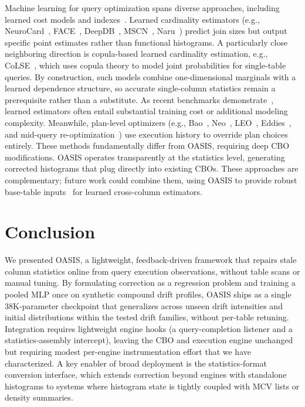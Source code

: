 \documentclass[runningheads]{llncs}
\begin{document}
Machine learning for query optimization spans diverse approaches, including learned cost models and indexes~\cite{kraska2018case,sun2019endtoend,wu2018towards}. Learned cardinality estimators (e.g., NeuroCard~\cite{yang2020neurocard}, FACE~\cite{yang2020face}, DeepDB~\cite{hilprecht2019deepdb}, MSCN~\cite{kipf2019learned}, Naru~\cite{yang2019deep}) predict join sizes but output specific point estimates rather than functional histograms. A particularly close neighboring direction is copula-based learned cardinality estimation, e.g., CoLSE~\cite{rathuwadu2025colse}, which uses copula theory to model joint probabilities for single-table queries. By construction, such models combine one-dimensional marginals with a learned dependence structure, so accurate single-column statistics remain a prerequisite rather than a substitute. As recent benchmarks demonstrate~\cite{dutt2021ready,han2021cardinality}, learned estimators often entail substantial training cost or additional modeling complexity. Meanwhile, plan-level optimizers (e.g., Bao~\cite{marcus2022bao}, Neo~\cite{marcus2019neo}, LEO~\cite{stillger2001leo}, Eddies~\cite{avnur2000eddies}, and mid-query re-optimization~\cite{kabra1998efficient}) use execution history to override plan choices entirely. These methods fundamentally differ from OASIS, requiring deep CBO modifications. OASIS operates transparently at the statistics level, generating corrected histograms that plug directly into existing CBOs. These approaches are complementary; future work could combine them, using OASIS to provide robust base-table inputs~\cite{leis2015good} for learned cross-column estimators.

\section{Conclusion}
\label{sec:conclusion}
We presented OASIS, a lightweight, feedback-driven framework that repairs stale
column statistics online from query execution observations, without table scans
or manual tuning.
By formulating correction as a regression problem and training a pooled
MLP once on synthetic compound drift profiles, OASIS ships as a single 38K-parameter
checkpoint that generalizes across unseen drift intensities and initial distributions
within the tested drift families, without per-table retuning.
Integration requires lightweight engine hooks (a query-completion listener
and a statistics-assembly intercept), leaving the CBO and execution engine unchanged
but requiring modest per-engine instrumentation effort that we have characterized.
A key enabler of broad deployment is the statistics-format conversion interface,
which extends correction beyond engines with standalone histograms to systems
where histogram state is tightly coupled with MCV lists or density summaries.
\end{document}
